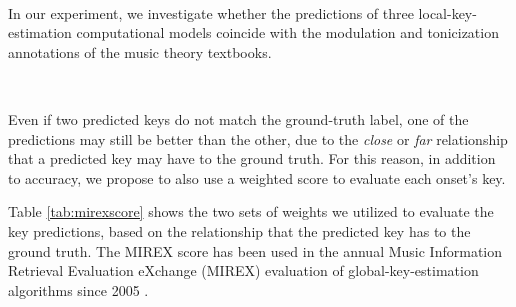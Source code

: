 
~\label{sec:exp}

In our experiment, we investigate whether the predictions of
three local-key-estimation computational models coincide
with the modulation and tonicization annotations of the
music theory textbooks.

~\label{sec:evaluations}

Even if two predicted keys do not match the ground-truth
label, one of the predictions may still be better than the
other, due to the \emph{close} or \emph{far} relationship
that a predicted key may have to the ground truth. For this
reason, in addition to accuracy, we propose to also use a
weighted score to evaluate each onset's key.

Table \ref{tab:mirexscore} shows the two sets of weights we
utilized to evaluate the key predictions, based on the
relationship that the predicted key has to the ground truth.
The MIREX score has been used in the annual Music
Information Retrieval Evaluation eXchange (MIREX) evaluation
of global-key-estimation algorithms since 2005
\cite{downie2005}.



